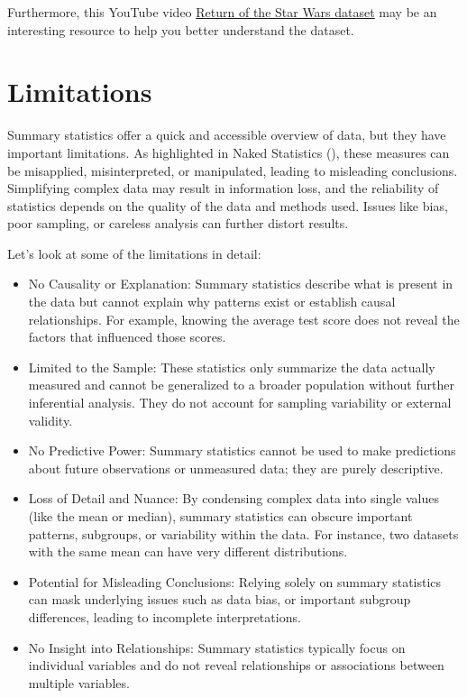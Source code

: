 \documentclass[
  man,
  floatsintext,
  longtable,
  nolmodern,
  notxfonts,
  notimes,
  colorlinks=true,linkcolor=blue,citecolor=blue,urlcolor=blue]{apa7}
\begin{document}
Furthermore, this YouTube video
\href{https://www.youtube.com/watch?v=4vSfbz9YMa0}{Return of the Star
Wars dataset} may be an interesting resource to help you better
understand the dataset.

\section{Limitations}\label{limitations}

Summary statistics offer a quick and accessible overview of data, but
they have important limitations. As highlighted in Naked Statistics
(), these measures can be
misapplied, misinterpreted, or manipulated, leading to misleading
conclusions. Simplifying complex data may result in information loss,
and the reliability of statistics depends on the quality of the data and
methods used. Issues like bias, poor sampling, or careless analysis can
further distort results.

Let's look at some of the limitations in detail:

\begin{itemize}
\item
  No Causality or Explanation: Summary statistics describe what is
  present in the data but cannot explain why patterns exist or establish
  causal relationships. For example, knowing the average test score does
  not reveal the factors that influenced those scores.
\item
  Limited to the Sample: These statistics only summarize the data
  actually measured and cannot be generalized to a broader population
  without further inferential analysis. They do not account for sampling
  variability or external validity.
\item
  No Predictive Power: Summary statistics cannot be used to make
  predictions about future observations or unmeasured data; they are
  purely descriptive.
\item
  Loss of Detail and Nuance: By condensing complex data into single
  values (like the mean or median), summary statistics can obscure
  important patterns, subgroups, or variability within the data. For
  instance, two datasets with the same mean can have very different
  distributions.
\item
  Potential for Misleading Conclusions: Relying solely on summary
  statistics can mask underlying issues such as data bias, or important
  subgroup differences, leading to incomplete interpretations.
\item
  No Insight into Relationships: Summary statistics typically focus on
  individual variables and do not reveal relationships or associations
  between multiple variables.
\end{itemize}
\end{document}
